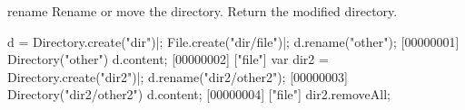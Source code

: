 \begin{urbiscriptapi}
\item[rename]
  Rename or move the directory. Return the modified directory.
\begin{urbiscript}
d = Directory.create("dir")|;
File.create("dir/file")|;
d.rename("other");
[00000001] Directory("other")
d.content;
[00000002] ["file"]
var dir2 = Directory.create("dir2")|;
d.rename("dir2/other2");
[00000003] Directory("dir2/other2")
d.content;
[00000004] ["file"]
dir2.removeAll;
\end{urbiscript}

\end{urbiscriptapi}


